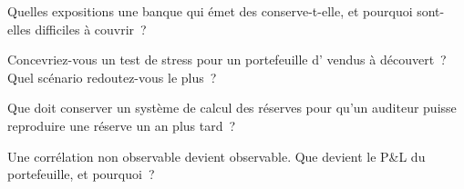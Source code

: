 \begin{interviewq}\label{iq:dv:managing-an-exotic-book:3}
Quelles expositions une banque qui émet des  conserve-t-elle, et pourquoi sont-elles difficiles à couvrir~?
\end{interviewq}

\begin{interviewq}\label{iq:dv:managing-an-exotic-book:4}
Concevriez-vous un test de stress pour un portefeuille d' vendus à découvert~? Quel scénario redoutez-vous le plus~?
\end{interviewq}

\begin{interviewq}\label{iq:dv:managing-an-exotic-book:5}
Que doit conserver un système de calcul des réserves pour qu'un auditeur puisse reproduire une réserve un an plus tard~?
\end{interviewq}

\begin{interviewq}\label{iq:dv:managing-an-exotic-book:6}
Une corrélation non observable devient observable. Que devient le P\&L du portefeuille, et pourquoi~?
\end{interviewq}
